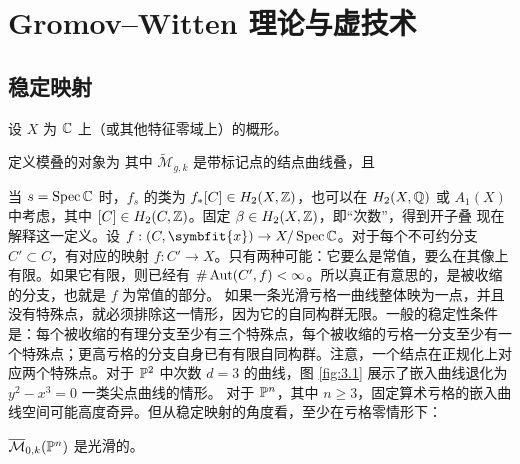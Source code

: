 \chapter{Gromov–Witten 理论与虚技术}
\section{稳定映射}
设 $X$ 为 $\mathbb C$ 上（或其他特征零域上）的概形。
\begin{definition}\label{def:3.1}
定义模叠的对象为
其中 $\widetilde{\mathcal M}_{g,k}$ 是带标记点的结点曲线叠，且
\end{definition}
当 $s=\operatorname{Spec}\mathbb C$ 时，$f_s$ 的类为 $f_*[C]\in H_2(X,\mathbb Z)$，也可以在 $H_2(X,\mathbb Q)$ 或 $A_1(X)$ 中考虑，其中 $[C]\in H_2(C,\mathbb Z)$。固定 $\beta\in H_2(X,\mathbb Z)$，即“次数”，得到开子叠
现在解释这一定义。设 $f:(C,\symbfit{x})\to X/\Spec\CC$。对于每个不可约分支 $C'\subset C$，有对应的映射 $f:C'\to X$。只有两种可能：它要么是常值，要么在其像上有限。如果它有限，则已经有 $\#\operatorname{Aut}(C',f)<\infty$。所以真正有意思的，是被收缩的分支，也就是 $f$ 为常值的部分。
如果一条光滑亏格一曲线整体映为一点，并且没有特殊点，就必须排除这一情形，因为它的自同构群无限。一般的稳定性条件是：每个被收缩的有理分支至少有三个特殊点，每个被收缩的亏格一分支至少有一个特殊点；更高亏格的分支自身已有有限自同构群。注意，一个结点在正规化上对应两个特殊点。对于 $\mathbb P^2$ 中次数 $d=3$ 的曲线，图 \ref{fig:3.1} 展示了嵌入曲线退化为 $y^2-x^3=0$ 一类尖点曲线的情形。
对于 $\mathbb P^n$，其中 $n\ge3$，固定算术亏格的嵌入曲线空间可能高度奇异。但从稳定映射的角度看，至少在亏格零情形下：
\begin{theorem}\label{thm:3.1}$\overline{\mathcal M}_{0,k}(\mathbb P^n)$ 是光滑的。\end{theorem}
